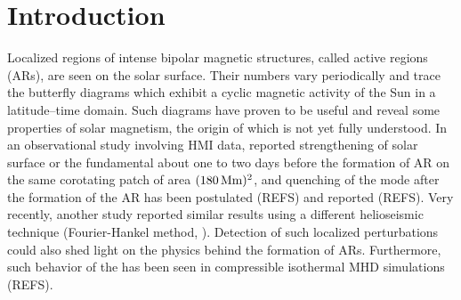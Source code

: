 \documentclass{aa}
\begin{document}

\maketitle

\section{Introduction} \label{sec:intro}

Localized regions of intense bipolar magnetic structures, called active regions
(ARs), are seen on the solar surface. Their numbers vary periodically and trace the
butterfly diagrams which exhibit a cyclic magnetic activity of the Sun in a latitude--time
domain. Such diagrams have proven to be useful and reveal some properties of solar
magnetism, the origin of which is not yet fully understood.
In an observational study involving
HMI data, \cite{SRB16} reported strengthening of solar surface or the fundamental \fff
about one to two days before
the formation of AR on the same corotating patch of area $(180\, \Mm)^2$,
and quenching of the mode after the formation of the AR has been postulated
(REFS) and reported (REFS).
Very recently, another study reported similar results using a different
helioseismic technique (Fourier-Hankel method, \cite{Waidele22}).
Detection of such localized perturbations
could also shed light
on the physics behind the formation of ARs.
Furthermore, such behavior of the \fff has been seen in compressible
isothermal MHD simulations (REFS). 
\end{document}
